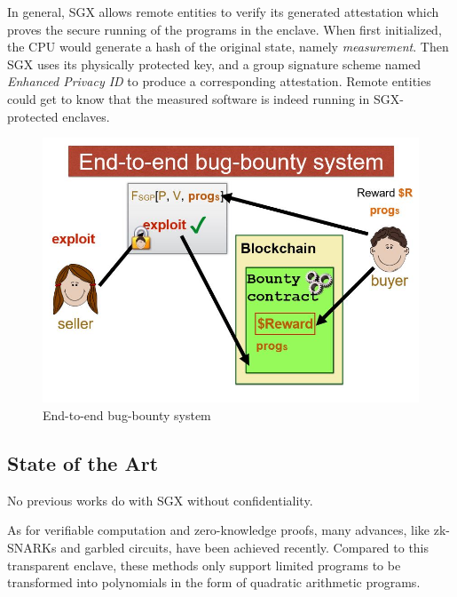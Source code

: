 \documentclass[conference]{IEEEtran}
\begin{document}
In general, SGX allows remote entities to verify its generated attestation which proves the secure running of the programs in the enclave.
%
When first initialized, the CPU would generate a hash of the original state, namely \textsl{measurement}.
%
Then SGX uses its physically protected key, and a group signature scheme named \textsl{Enhanced Privacy ID} to produce a corresponding attestation.
%
Remote entities could get to know that the measured software is indeed running in SGX-protected enclaves.

\begin{figure}[ht]
    \centering
    \includegraphics[width= 0.95\linewidth]{fig/system2.jpg}
    \caption{End-to-end bug-bounty system}
    \label{e2e}
\end{figure}

\subsection{State of the Art}
No previous works do with SGX without confidentiality.

As for verifiable computation and zero-knowledge proofs, many advances, like zk-SNARKs\cite{ben2013snarks} and garbled circuits\cite{huang2011faster}, have been achieved recently.
%
Compared to this transparent enclave, these methods only support limited programs to be transformed into polynomials in the form of quadratic arithmetic programs.
\end{document}
